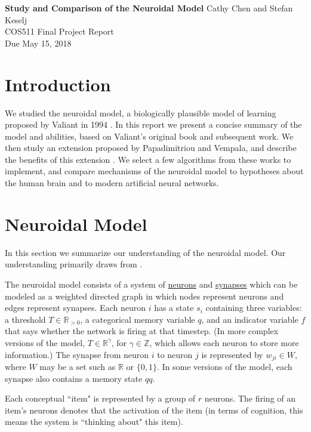 \documentclass[letterpaper, 12pt]{article}
\begin{document}
\noindent
\textbf{Study and Comparison of the Neuroidal Model} \hfill \newline Cathy Chen and Stefan Keselj \\
COS511 Final Project Report \\
Due May 15, 2018

\section{Introduction}
We studied the neuroidal model, a biologically plausible model of learning proposed by Valiant in 1994 \cite{valiant_circuits_1994}. In this report we present a concise summary of the model and abilities, based on Valiant's original book and subsequent work. We then study an extension proposed by Papadimitriou and Vempala, and describe the benefits of this extension \cite{papadimitriou_cortical_2015}. We select a few algorithms from these works to implement, and compare mechanisms of the neuroidal model to hypotheses about the human brain and to modern artificial neural networks.

\section{Neuroidal Model}\label{sec:model}
In this section we summarize our understanding of the neuroidal model. Our understanding primarily draws from \cite{valiant_circuits_1994, valiant_memorization_2005, papadimitriou_cortical_2015}.

The neuroidal model consists of a system of \underline{neurons} and \underline{synapses} which can be modeled as a weighted directed graph in which nodes represent neurons and edges represent synapses. Each neuron $i$ has a state $s_i$ containing three variables: a threshold $T\in\mathbb{R}_{>0}$, a categorical memory variable $q$, and an indicator variable $f$ that says whether the network is firing at that timestep. (In more complex versions of the model, $T\in\mathbb{R}^\gamma$, for $\gamma\in\mathbb{Z}$, which allows each neuron to store more information.) The synapse from neuron $i$ to neuron $j$ is represented by $w_{ji}\in W$, where $W$ may be a set such as $\mathbb{R}$ or $\{0,1\}$. In some versions of the model, each synapse also contains a memory state $qq$.

Each conceptual ``item" is represented by a group of $r$ neurons. The firing of an item's neurons denotes that the activation of the item (in terms of cognition, this means the system is ``thinking about" this item). 
\end{document}
